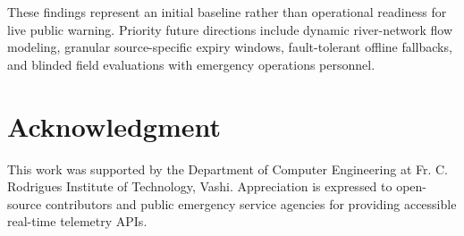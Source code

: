 \documentclass[conference]{IEEEtran}
\begin{document}
These findings represent an initial baseline rather than operational readiness for live public warning. Priority future directions include dynamic river-network flow modeling, granular source-specific expiry windows, fault-tolerant offline fallbacks, and blinded field evaluations with emergency operations personnel.

\section*{Acknowledgment}
This work was supported by the Department of Computer Engineering at Fr. C. Rodrigues Institute of Technology, Vashi. Appreciation is expressed to open-source contributors and public emergency service agencies for providing accessible real-time telemetry APIs.
\end{document}
